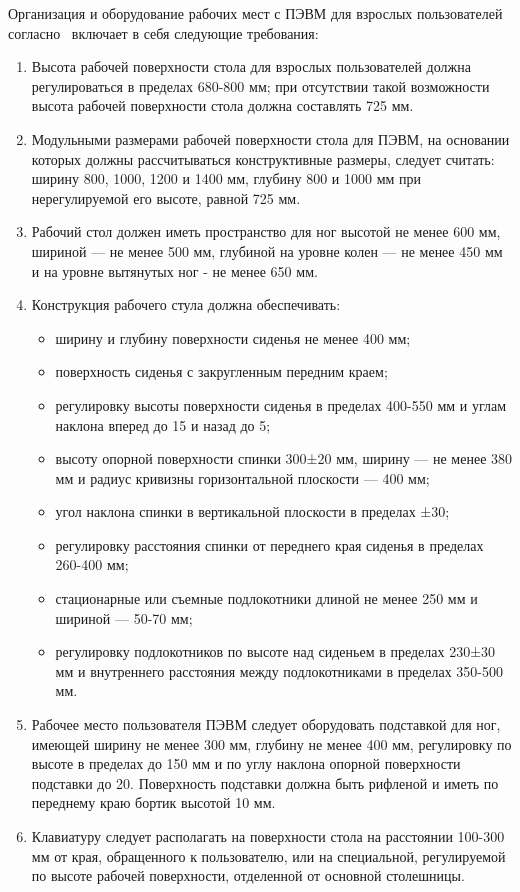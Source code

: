 Организация и оборудование рабочих мест с ПЭВМ для взрослых пользователей согласно~\cite{sanpin_2.4.1340-03}
включает в себя следующие требования:
\begin{enumerate}
 \item Высота рабочей поверхности стола для взрослых пользователей должна регулироваться в пределах 
 680-800 мм; при отсутствии такой возможности высота рабочей поверхности стола должна составлять 725 мм.
 \item Модульными размерами рабочей поверхности стола для ПЭВМ, на основании которых должны 
 рассчитываться конструктивные размеры, следует считать: ширину 800, 1000, 1200 и 1400 мм, глубину 800 
 и 1000 мм при нерегулируемой его высоте, равной 725 мм.
 \item Рабочий стол должен иметь пространство для ног высотой не менее 600 мм, шириной --- не менее 500 мм, 
 глубиной на уровне колен --- не менее 450 мм и на уровне вытянутых ног - не менее 650 мм.
 \item Конструкция рабочего стула должна обеспечивать:
 \begin{itemize}
  \item ширину и глубину поверхности сиденья не менее 400 мм;
  \item поверхность сиденья с закругленным передним краем;
  \item регулировку высоты поверхности сиденья в пределах 400-550 мм и углам наклона вперед до 15\textdegree{} и назад до 5\textdegree{};
  \item высоту опорной поверхности спинки 300±20 мм, ширину --- не менее 380 мм и радиус кривизны горизонтальной плоскости --- 400 мм;
  \item угол наклона спинки в вертикальной плоскости в пределах ±30\textdegree{};
  \item регулировку расстояния спинки от переднего края сиденья в пределах 260-400 мм;
  \item стационарные или съемные подлокотники длиной не менее 250 мм и шириной --- 50-70 мм;
  \item регулировку подлокотников по высоте над сиденьем в пределах 230±30 мм и внутреннего расстояния между 
  подлокотниками в пределах 350-500 мм.
 \end{itemize}
 \item Рабочее место пользователя ПЭВМ следует оборудовать подставкой для ног, имеющей ширину не менее 300 мм, глубину не менее 400 мм, 
 регулировку по высоте в пределах до 150 мм и по углу наклона опорной поверхности подставки 
 до 20\textdegree. Поверхность подставки должна быть рифленой и иметь по переднему краю бортик высотой 10 мм.
 \item Клавиатуру следует располагать на поверхности стола на расстоянии 100-300 мм от края, обращенного к пользователю, или на специальной, 
 регулируемой по высоте рабочей поверхности, отделенной от основной столешницы.
\end{enumerate}

